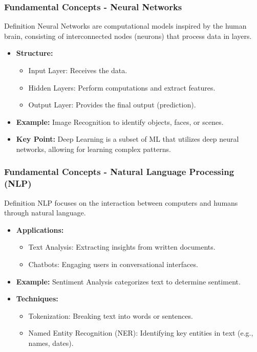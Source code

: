 \documentclass[aspectratio=169]{beamer}
\begin{document}
\begin{frame}[fragile]
    \frametitle{Fundamental Concepts - Neural Networks}
    \begin{block}{Definition}
        Neural Networks are computational models inspired by the human brain, consisting of interconnected nodes (neurons) that process data in layers.
    \end{block}
    
    \begin{itemize}
        \item \textbf{Structure:}
        \begin{itemize}
            \item Input Layer: Receives the data.
            \item Hidden Layers: Perform computations and extract features.
            \item Output Layer: Provides the final output (prediction).
        \end{itemize}
        \item \textbf{Example:} Image Recognition to identify objects, faces, or scenes.
        \item \textbf{Key Point:} Deep Learning is a subset of ML that utilizes deep neural networks, allowing for learning complex patterns.
    \end{itemize}
\end{frame}

\begin{frame}[fragile]
    \frametitle{Fundamental Concepts - Natural Language Processing (NLP)}
    \begin{block}{Definition}
        NLP focuses on the interaction between computers and humans through natural language.
    \end{block}

    \begin{itemize}
        \item \textbf{Applications:}
        \begin{itemize}
            \item Text Analysis: Extracting insights from written documents.
            \item Chatbots: Engaging users in conversational interfaces.
        \end{itemize}
        \item \textbf{Example:} Sentiment Analysis categorizes text to determine sentiment.
        \item \textbf{Techniques:}
        \begin{itemize}
            \item Tokenization: Breaking text into words or sentences.
            \item Named Entity Recognition (NER): Identifying key entities in text (e.g., names, dates).
        \end{itemize}
    \end{itemize}
\end{frame}
\end{document}
